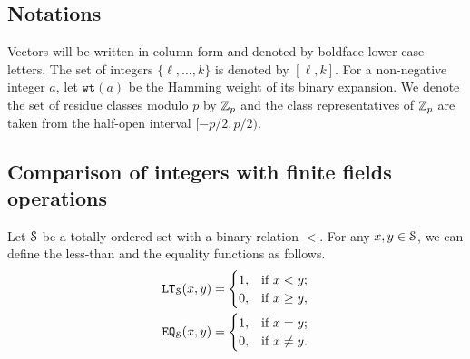 \subsection{Notations}
  Vectors will be written in column form and denoted by boldface lower-case letters. 
  The set of integers $\{\ell,\ldots,k\}$ is denoted by $[\ell,k]$.
  For a non-negative integer $a$, let $\texttt{wt}(a)$ be the Hamming weight of its binary expansion. We denote the set of residue classes modulo $p$ by $\Z_p$ and the class representatives of $\Z_p$ are taken from the half-open interval $[-p/2, p/2)$.

\subsection{Comparison of integers with finite fields operations}
  Let $\S$ be a totally ordered set with a binary relation $<$.
  For any $x,y \in \S$, we can define the less-than and the equality functions as follows.
  \begin{align*}
    \LT_\S(x,y) = 
    \begin{cases}
      1, & \text{if } x < y; \\
      0, & \text{if } x \ge y, \\
    \end{cases}
    \\
    \EQ_\S(x,y) = 
    \begin{cases}
      1, & \text{if } x = y; \\
      0, & \text{if } x \neq y. \\
    \end{cases}
  \end{align*}

